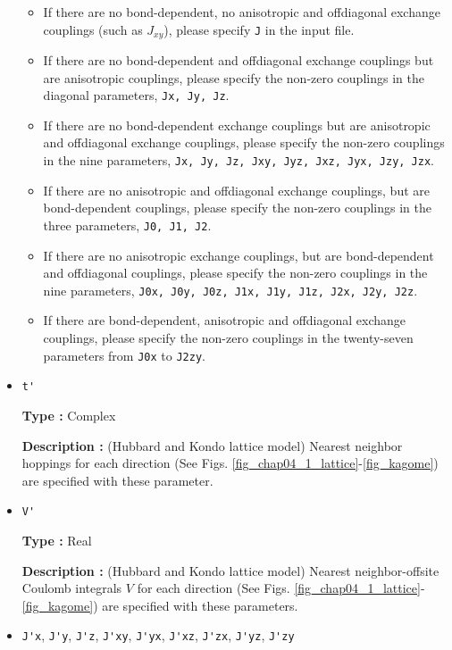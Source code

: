\begin{itemize}
\begin{itemize}

\item If there are no bond-dependent, no anisotropic and offdiagonal exchange couplings (such as $J_{x y}$),
please specify \verb|J| in the input file.

\item If there are no bond-dependent and offdiagonal exchange couplings
but are anisotropic couplings,
please specify the non-zero couplings in the diagonal parameters, \verb|Jx, Jy, Jz|.

\item If there are no bond-dependent exchange couplings
but are anisotropic and offdiagonal exchange couplings,
please specify the non-zero couplings in the nine parameters,
\verb|Jx, Jy, Jz, Jxy, Jyz, Jxz, Jyx, Jzy, Jzx|.

\item If there are no anisotropic and offdiagonal exchange couplings,
but are bond-dependent couplings,
please specify the non-zero couplings in the three parameters,
\verb|J0, J1, J2|.

\item If there are no anisotropic exchange couplings, but are bond-dependent and offdiagonal couplings,
please specify the non-zero couplings in the nine parameters,
\verb|J0x, J0y, J0z, J1x, J1y, J1z, J2x, J2y, J2z|.

\item If there are bond-dependent, anisotropic and offdiagonal exchange couplings,
please specify the non-zero couplings in the twenty-seven parameters from
\verb|J0x| to \verb|J2zy|.

\end{itemize}
\item \verb|t'|

{\bf Type :} Complex

{\bf Description :} (Hubbard and Kondo lattice model)
Nearest neighbor hoppings for each direction
(See Figs. \ref{fig_chap04_1_lattice}-\ref{fig_kagome})
are specified with these parameter.

\item \verb|V'|

{\bf Type :} Real

{\bf Description :} (Hubbard and Kondo lattice model)
Nearest neighbor-offsite Coulomb integrals $V$
 for each direction
(See Figs. \ref{fig_chap04_1_lattice}-\ref{fig_kagome})
are specified with these parameters.

\item \verb|J'x|, \verb|J'y|, \verb|J'z|, \verb|J'xy|, 
  \verb|J'yx|, \verb|J'xz|, \verb|J'zx|, \verb|J'yz|, \verb|J'zy|


\end{itemize}
